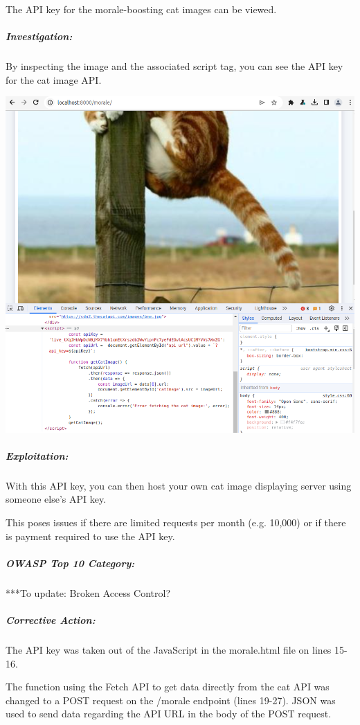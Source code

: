 The API key for the morale-boosting cat images can be viewed.

\subparagraph{Investigation:}

By inspecting the image and the associated script tag, you can see the API key for the cat image API.

\begin{center}
    \includegraphics[width = \linewidth]{images/Michelle/morale.png}
\end{center}


\subparagraph{Exploitation:}

With this API key, you can then host your own cat image displaying server using someone else's API key.

This poses issues if there are limited requests per month (e.g. 10,000) or if there is payment required to use the API key.

\subparagraph{OWASP Top 10 Category:}

***To update: Broken Access Control?

\subparagraph{Corrective Action:}

The API key was taken out of the JavaScript in the morale.html file on lines 15-16.

The function using the Fetch API to get data directly from the cat API was changed to a POST request on the /morale endpoint (lines 19-27). JSON was used to send data regarding the API URL in the body of the POST request.

